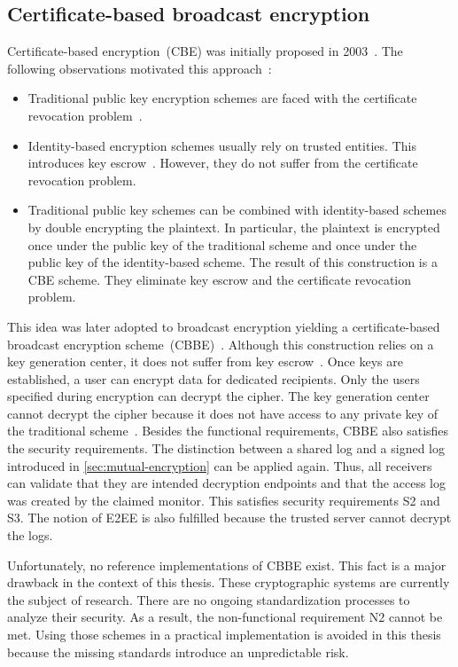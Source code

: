 \documentclass[../main.tex]{subfiles}
\begin{document}
\subsection{Certificate-based broadcast encryption}
\label{sec:broadcast-certificate}

Certificate-based encryption~(CBE) was initially proposed in 2003~\cite{Gentry2003}. 
The following observations motivated this approach~\cite{Hagg2022}:
\begin{itemize}
    \item 
    Traditional public key encryption schemes are faced with the certificate revocation problem~\cite{Gentry2003}.
    \item 
    Identity-based encryption schemes usually rely on trusted entities. 
    This introduces key escrow~\cite{Hagg2022}.
    However, they do not suffer from the certificate revocation problem.
    \item 
    Traditional public key schemes can be combined with identity-based schemes by double encrypting the plaintext.
    In particular, the plaintext is encrypted once under the public key of the traditional scheme and once under the public key of the identity-based scheme.
    The result of this construction is a CBE scheme.
    They eliminate key escrow and the certificate revocation problem.~\cite{Hagg2022}
\end{itemize}

This idea was later adopted to broadcast encryption yielding a certificate-based broadcast encryption scheme~(CBBE)~\cite{Li2018}.
Although this construction relies on a key generation center, it does not suffer from key escrow~\cite{Hagg2022}.
Once keys are established, a user can encrypt data for dedicated recipients.
Only the users specified during encryption can decrypt the cipher.
The key generation center cannot decrypt the cipher because it does not have access to any private key of the traditional scheme~\cite{Hagg2022}.
Besides the functional requirements, CBBE also satisfies the security requirements.
The distinction between a shared log and a signed log introduced in \cref{sec:mutual-encryption} can be applied again.
Thus, all receivers can validate that they are intended decryption endpoints and that the access log was created by the claimed monitor.
This satisfies security requirements S2 and S3.
The notion of E2EE is also fulfilled because the trusted server cannot decrypt the logs.

Unfortunately, no reference implementations of CBBE exist.
This fact is a major drawback in the context of this thesis.
These cryptographic systems are currently the subject of research.
There are no ongoing standardization processes to analyze their security.
As a result, the non-functional requirement N2 cannot be met.
Using those schemes in a practical implementation is avoided in this thesis because the missing standards introduce an unpredictable risk.
\end{document}
